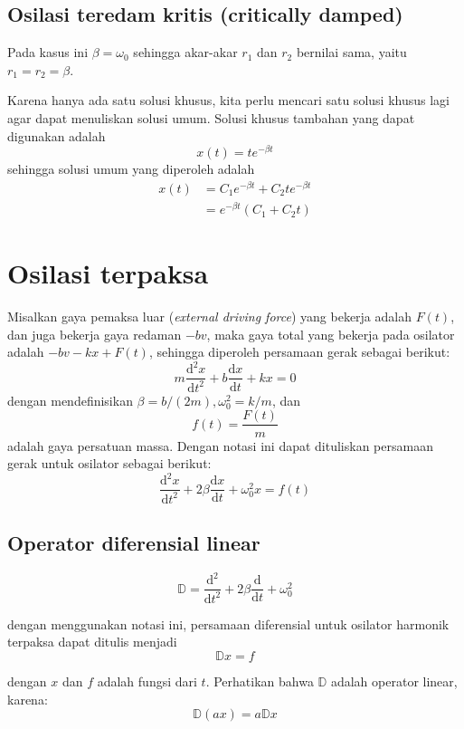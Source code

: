 \subsection*{Osilasi teredam kritis (critically damped)}

Pada kasus ini $\beta=\omega_{0}$ sehingga
akar-akar $r_{1}$ dan $r_{2}$ bernilai sama, yaitu $r_{1} = r_{2} = \beta$.

Karena hanya ada satu solusi khusus, kita perlu mencari satu solusi khusus
lagi agar dapat menuliskan solusi umum. Solusi khusus tambahan yang
dapat digunakan adalah
\begin{equation}
x(t) = te^{-\beta t}
\end{equation}
sehingga solusi umum yang diperoleh adalah
\begin{align*}
x(t) & = C_{1}e^{-\beta t} + C_{2}te^{-\beta t} \\
     & = e^{-\beta t}\left(C_{1} + C_{2}t \right)
\end{align*}


\section{Osilasi terpaksa}

Misalkan gaya pemaksa luar (\textit{external driving force}) yang bekerja adalah
$F(t)$, dan juga bekerja gaya redaman $-bv$, maka gaya total yang
bekerja pada osilator adalah $-bv-kx+F(t)$, sehingga diperoleh persamaan
gerak sebagai berikut:
\[
m\frac{\mathrm{d}^{2}x}{\mathrm{d}t^{2}}+b\frac{\mathrm{d}x}{\mathrm{d}t}+kx=0
\]
dengan mendefinisikan $\beta=b/(2m),$$\omega_{0}^{2}=k/m$, dan
\[
f(t)=\frac{F(t)}{m}
\]
adalah gaya persatuan massa. Dengan notasi ini dapat dituliskan persamaan
gerak untuk osilator sebagai berikut:
\[
\frac{\mathrm{d}^{2}x}{\mathrm{d}t^{2}}+2\beta\frac{\mathrm{d}x}{\mathrm{d}t}+\omega_{0}^{2}x=f(t)
\]

\subsection{Operator diferensial linear}

\[
\mathbb{D}=\frac{\mathrm{d}^{2}}{\mathrm{d}t^{2}}+2\beta\frac{\mathrm{d}}{\mathrm{d}t}+\omega_{0}^{2}
\]

dengan menggunakan notasi ini, persamaan diferensial untuk osilator
harmonik terpaksa dapat ditulis menjadi
\[
\mathbb{D}x=f
\]

dengan $x$ dan $f$ adalah fungsi dari $t$. Perhatikan bahwa $\mathbb{D}$
adalah operator linear, karena:
\[
\mathbb{D}(ax)=a\mathbb{D}x
\]

